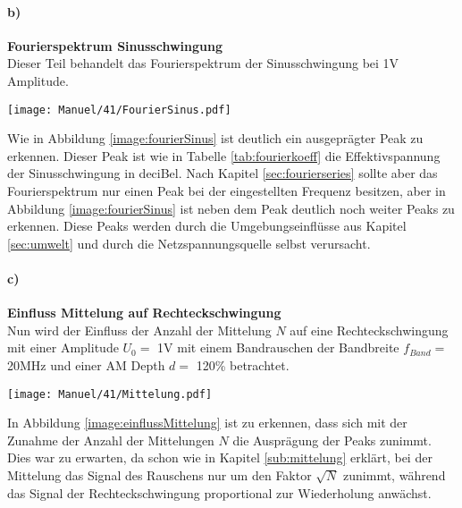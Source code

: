 \paragraph{b)}\textbf{Fourierspektrum Sinusschwingung}\\
Dieser Teil behandelt das Fourierspektrum der Sinusschwingung bei 1V Amplitude.
\begin{center}
    \texttt{[image: Manuel/41/FourierSinus.pdf]}
    \label{image:fourierSinus}
\end{center}
Wie in Abbildung \ref{image:fourierSinus} ist deutlich ein ausgeprägter Peak zu erkennen. Dieser Peak ist wie in Tabelle \ref{tab:fourierkoeff} die Effektivspannung der Sinusschwingung in deciBel. Nach Kapitel \ref{sec:fourierseries} sollte aber das Fourierspektrum nur einen Peak bei der eingestellten Frequenz besitzen, aber in Abbildung \ref{image:fourierSinus} ist neben dem Peak deutlich noch weiter Peaks zu erkennen. Diese Peaks werden durch die Umgebungseinflüsse aus Kapitel \ref{sec:umwelt} und durch die Netzspannungsquelle selbst verursacht.
\newpage
\paragraph{c)}\textbf{Einfluss Mittelung auf Rechteckschwingung}\\
Nun wird der Einfluss der Anzahl der Mittelung $N$ auf eine Rechteckschwingung mit einer Amplitude $U_0=$ 1V mit einem Bandrauschen der Bandbreite $f_{Band}=$ 20MHz und einer AM Depth $d =$ 120\% betrachtet.
\begin{center}
    \texttt{[image: Manuel/41/Mittelung.pdf]}
    \label{image:einflussMittelung}
\end{center}
In Abbildung \ref{image:einflussMittelung} ist zu erkennen, dass sich mit der Zunahme der Anzahl der Mittelungen $N$ die Ausprägung der Peaks zunimmt. Dies war zu erwarten, da schon wie in Kapitel \ref{sub:mittelung} erklärt, bei der Mittelung das Signal des Rauschens nur um den Faktor $\sqrt{N}$ zunimmt, während das Signal der Rechteckschwingung proportional zur Wiederholung anwächst.
\newpage
